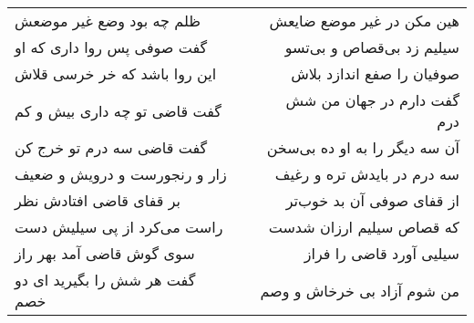 \begin{center}
\begin{longtable}{l p{0.5cm} r}
\\
ظلم چه بود وضع غیر موضعش
&&
هین مکن در غیر موضع ضایعش
\\
گفت صوفی پس روا داری که او
&&
سیلیم زد بی‌قصاص و بی‌تسو
\\
این روا باشد که خر خرسی قلاش
&&
صوفیان را صفع اندازد بلاش
\\
گفت قاضی تو چه داری بیش و کم
&&
گفت دارم در جهان من شش درم
\\
گفت قاضی سه درم تو خرج کن
&&
آن سه دیگر را به او ده بی‌سخن
\\
زار و رنجورست و درویش و ضعیف
&&
سه درم در بایدش تره و رغیف
\\
بر قفای قاضی افتادش نظر
&&
از قفای صوفی آن بد خوب‌تر
\\
راست می‌کرد از پی سیلیش دست
&&
که قصاص سیلیم ارزان شدست
\\
سوی گوش قاضی آمد بهر راز
&&
سیلیی آورد قاضی را فراز
\\
گفت هر شش را بگیرید ای دو خصم
&&
من شوم آزاد بی خرخاش و وصم
\\
\end{longtable}
\end{center}

